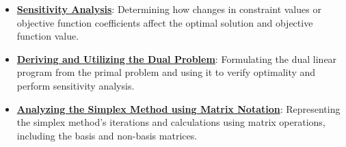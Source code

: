 \documentclass{article}%
\begin{document}
\begin{itemize}[leftmargin=*]%
\item \href{https://www.math.purdue.edu/~yipn/421/2024-10-01-SensitivityDuality.pdf#page=7}{\textbf{Sensitivity Analysis}}: Determining how changes in constraint values or objective function coefficients affect the optimal solution and objective function value.%
\item \href{https://www.math.purdue.edu/~yipn/421/2024-10-01-SensitivityDuality.pdf#page=2}{\textbf{Deriving and Utilizing the Dual Problem}}: Formulating the dual linear program from the primal problem and using it to verify optimality and perform sensitivity analysis.%
\item \href{https://www.math.purdue.edu/~yipn/421/2024-10-01-SensitivityDuality.pdf#page=4}{\textbf{Analyzing the Simplex Method using Matrix Notation}}: Representing the simplex method's iterations and calculations using matrix operations, including the basis and non-basis matrices.%
\end{itemize}%
\end{document}
